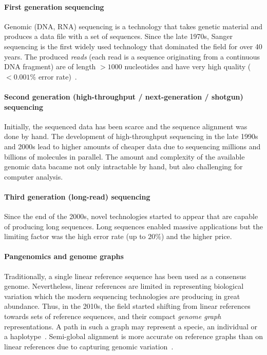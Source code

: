 \paragraph{First generation sequencing}
Genomic (DNA, RNA) sequencing is a technology that takes genetic material and
produces a data file with a set of sequences. Since the late 1970s, Sanger
sequencing is the first widely used technology that dominated the field for over
40 years. The produced \emph{reads} (each read is a sequence originating from a
continuous DNA fragment) are of length ${>}1000$ nucleotides and have very high
quality (${<}0.001\%$ error rate)~\citep{shendure2008next}.

\paragraph{Second generation (high-throughput / next-generation / shotgun) sequencing}
Initially, the sequenced data has been scarce and the sequence alignment was
done by hand. The development of high-throughput sequencing in the late 1990s
and 2000s lead to higher amounts of cheaper data due to sequencing millions and
billions of molecules in parallel. The amount and complexity of the available
genomic data bacame not only intractable by hand, but also challenging for
computer analysis.

\paragraph{Third generation (long-read) sequencing}
Since the end of the 2000s, novel technologies started to appear that are
capable of producing long sequences. Long sequences enabled massive applications
but the limiting factor was the high error rate (up to $20\%$) and the higher
price.

\paragraph{Pangenomics and genome graphs}
Traditionally, a single linear reference sequence has been used as a consensus
genome. Nevertheless, linear references are limited in representing biological
variation which the modern sequencing technologies are producing in great
abundance. Thus, in the 2010s, the field started shifting from linear references
towards sets of reference sequences, and their compact \emph{genome graph}
representations. A path in such a graph may represent a specie, an individual or
a haplotype~\cite{dilthey_improved_2015,paten_genome_2017}. Semi-global
alignment is more accurate on reference graphs than on linear references due to
capturing genomic variation~\citep{garrison_variation_2018}.

